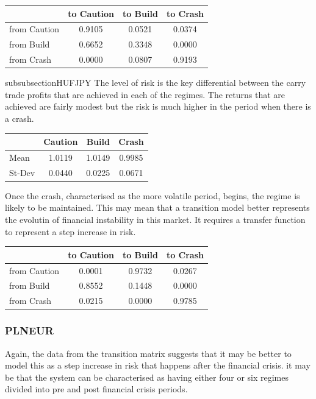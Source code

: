 \documentclass[12pt, a4paper, oneside]{article} %
\begin{document}
 \begin{centering}
 \begin{tabular}{l c c c}
 & to Caution & to Build & to Crash\\
 \hline
 from Caution & 0.9105 & 0.0521 & 0.0374\\
 from Build & 0.6652 & 0.3348 & 0.0000\\
 from Crash & 0.0000 & 0.0807 & 0.9193
 \end{tabular}
 \end{centering}
 

subsubsection{HUFJPY}
The level of risk is the key differential between the carry trade profits that are achieved in each of the regimes.  The returns that are achieved are fairly modest but the risk is much higher in the period when there is a crash.   

\begin{centering}
 \begin{tabular}{l c c c}
 & Caution & Build & Crash \\
 \hline
 Mean & 1.0119 & 1.0149 & 0.9985\\
 St-Dev & 0.0440 & 0.0225 & 0.0671\\
 \end{tabular}
 \end{centering}

Once the crash, characterised as the more volatile period, begins, the regime is likely to be maintained.  This may mean that a transition model better represents the evolutin of financial instability in this market. It requires a transfer function to represent a step increase in risk. 

 \begin{centering}
 \begin{tabular}{l c c c}
 & to Caution & to Build & to Crash\\
 \hline
 from Caution & 0.0001 & 0.9732 & 0.0267\\
 from Build & 0.8552 & 0.1448 & 0.0000\\
 from Crash & 0.0215 & 0.0000 & 0.9785
 \end{tabular}
 \end{centering}
 \subsubsection{PLNEUR}
Again, the data from the transition matrix suggests that it may be better to model this as a step increase in risk that happens after the financial crisis.  it may be that the system can be characterised as having either four or six regimes divided into pre and post financial crisis periods. 
\end{document}
